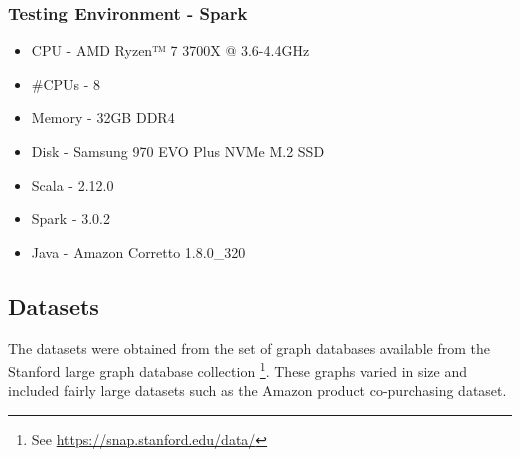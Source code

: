 \subsubsection{Testing Environment - Spark}
\begin{itemize}
    \item CPU - AMD Ryzen™ 7 3700X @ 3.6-4.4GHz
    \item \#CPUs - 8
    \item Memory - 32GB DDR4
    \item Disk - Samsung 970 EVO Plus NVMe M.2 SSD
    \item Scala - 2.12.0
    \item Spark - 3.0.2
    \item Java - Amazon Corretto 1.8.0\_320
\end{itemize}

\subsection{Datasets}
The datasets were obtained from the set of graph databases available from the Stanford large graph database collection \footnote{See \url{https://snap.stanford.edu/data/}}. These graphs varied in size and included fairly large datasets such as the Amazon product co-purchasing dataset.

\begin{table}[!h]
    \centering
    \label{table:dataset}
    \caption{Dataset characteristics used in experiments}
\end{table}

